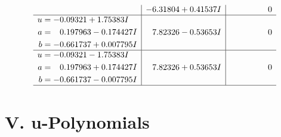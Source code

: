 \documentclass[1p]{elsarticle_modified}
\theoremstyle{definition}
\begin{document}
$$\begin{array}{c|c|c}
 & -6.31804 + 0.41537 I & \phantom{-0.000000 } 0 \\ \hline\begin{aligned}
u &= -0.09321 + 1.75383 I \\
a &= \phantom{-}0.197963 - 0.174427 I \\
b &= -0.661737 + 0.007795 I\end{aligned}
 & \phantom{-}7.82326 - 0.53653 I & \phantom{-0.000000 } 0 \\ \hline\begin{aligned}
u &= -0.09321 - 1.75383 I \\
a &= \phantom{-}0.197963 + 0.174427 I \\
b &= -0.661737 - 0.007795 I\end{aligned}
 & \phantom{-}7.82326 + 0.53653 I & \phantom{-0.000000 } 0\\
 \hline 
 \end{array}$$\newpage
\newpage\renewcommand{\arraystretch}{1}
\centering \section*{ V. u-Polynomials}
\end{document}
